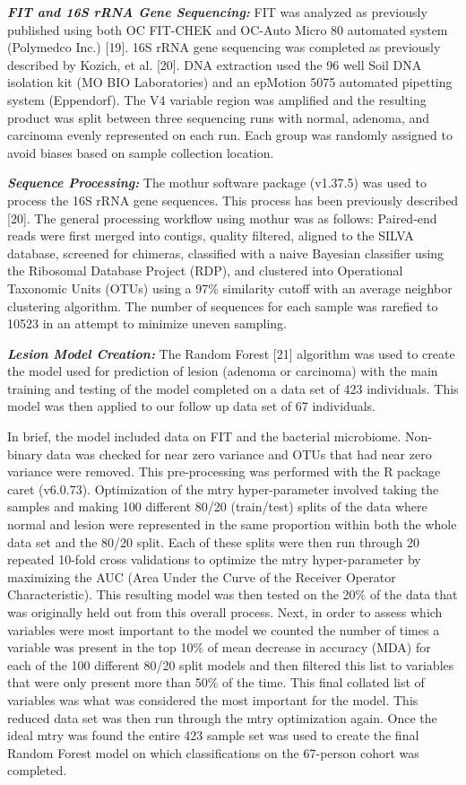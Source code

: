 \documentclass[12pt,]{article}
\begin{document}
\textbf{\emph{FIT and 16S rRNA Gene Sequencing:}} FIT was analyzed as
previously published using both OC FIT-CHEK and OC-Auto Micro 80
automated system (Polymedco Inc.) {[}19{]}. 16S rRNA gene sequencing was
completed as previously described by Kozich, et al. {[}20{]}. DNA
extraction used the 96 well Soil DNA isolation kit (MO BIO Laboratories)
and an epMotion 5075 automated pipetting system (Eppendorf). The V4
variable region was amplified and the resulting product was split
between three sequencing runs with normal, adenoma, and carcinoma evenly
represented on each run. Each group was randomly assigned to avoid
biases based on sample collection location.

\textbf{\emph{Sequence Processing:}} The mothur software package
(v1.37.5) was used to process the 16S rRNA gene sequences. This process
has been previously described {[}20{]}. The general processing workflow
using mothur was as follows: Paired-end reads were first merged into
contigs, quality filtered, aligned to the SILVA database, screened for
chimeras, classified with a naive Bayesian classifier using the
Ribosomal Database Project (RDP), and clustered into Operational
Taxonomic Units (OTUs) using a 97\% similarity cutoff with an average
neighbor clustering algorithm. The number of sequences for each sample
was rarefied to 10523 in an attempt to minimize uneven sampling.

\textbf{\emph{Lesion Model Creation:}} The Random Forest {[}21{]}
algorithm was used to create the model used for prediction of lesion
(adenoma or carcinoma) with the main training and testing of the model
completed on a data set of 423 individuals. This model was then applied
to our follow up data set of 67 individuals.

In brief, the model included data on FIT and the bacterial microbiome.
Non-binary data was checked for near zero variance and OTUs that had
near zero variance were removed. This pre-processing was performed with
the R package caret (v6.0.73). Optimization of the mtry hyper-parameter
involved taking the samples and making 100 different 80/20 (train/test)
splits of the data where normal and lesion were represented in the same
proportion within both the whole data set and the 80/20 split. Each of
these splits were then run through 20 repeated 10-fold cross validations
to optimize the mtry hyper-parameter by maximizing the AUC (Area Under
the Curve of the Receiver Operator Characteristic). This resulting model
was then tested on the 20\% of the data that was originally held out
from this overall process. Next, in order to assess which variables were
most important to the model we counted the number of times a variable
was present in the top 10\% of mean decrease in accuracy (MDA) for each
of the 100 different 80/20 split models and then filtered this list to
variables that were only present more than 50\% of the time. This final
collated list of variables was what was considered the most important
for the model. This reduced data set was then run through the mtry
optimization again. Once the ideal mtry was found the entire 423 sample
set was used to create the final Random Forest model on which
classifications on the 67-person cohort was completed.
\end{document}
